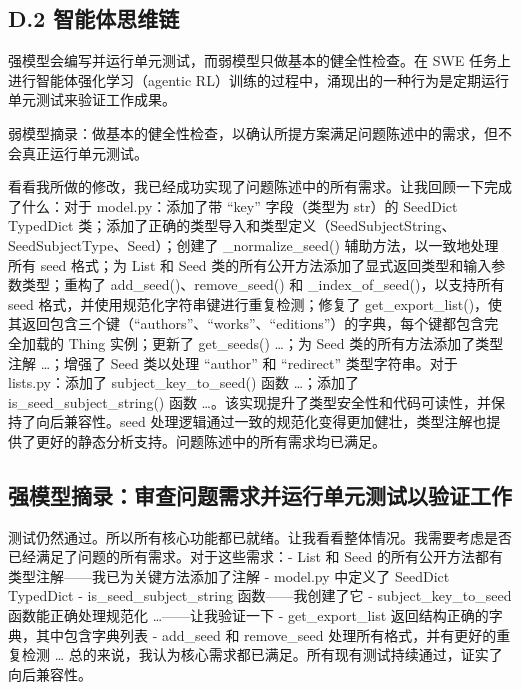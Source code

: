 \subsection{D.2 智能体思维链}\label{d.2-agentic-cots}

强模型会编写并运行单元测试，而弱模型只做基本的健全性检查。在 SWE 任务上进行智能体强化学习（agentic RL）训练的过程中，涌现出的一种行为是定期运行单元测试来验证工作成果。



弱模型摘录：做基本的健全性检查，以确认所提方案满足问题陈述中的需求，但不会真正运行单元测试。

看看我所做的修改，我已经成功实现了问题陈述中的所有需求。让我回顾一下完成了什么：对于 model.py：添加了带 ``key'' 字段（类型为 str）的 SeedDict TypedDict 类；添加了正确的类型导入和类型定义（SeedSubjectString、SeedSubjectType、Seed）；创建了 \_normalize\_seed() 辅助方法，以一致地处理所有 seed 格式；为 List 和 Seed 类的所有公开方法添加了显式返回类型和输入参数类型；重构了 add\_seed()、remove\_seed() 和 \_index\_of\_seed()，以支持所有 seed 格式，并使用规范化字符串键进行重复检测；修复了 get\_export\_list()，使其返回包含三个键（``authors''、``works''、``editions''）的字典，每个键都包含完全加载的 Thing 实例；更新了 get\_seeds() \ldots{}；为 Seed 类的所有方法添加了类型注解 \ldots{}；增强了 Seed 类以处理 ``author'' 和 ``redirect'' 类型字符串。对于 lists.py：添加了 subject\_key\_to\_seed() 函数 \ldots{}；添加了 is\_seed\_subject\_string() 函数 \ldots{}。该实现提升了类型安全性和代码可读性，并保持了向后兼容性。seed 处理逻辑通过一致的规范化变得更加健壮，类型注解也提供了更好的静态分析支持。问题陈述中的所有需求均已满足。

\subsection{强模型摘录：审查问题需求并运行单元测试以验证工作}\label{strong-model-excerpt-reviews-problems-requirements-and-runs-unit-tests-to-check-work.}

测试仍然通过。所以所有核心功能都已就绪。让我看看整体情况。我需要考虑是否已经满足了问题的所有需求。对于这些需求：- List 和 Seed 的所有公开方法都有类型注解——我已为关键方法添加了注解 - model.py 中定义了 SeedDict TypedDict - is\_seed\_subject\_string 函数——我创建了它 - subject\_key\_to\_seed 函数能正确处理规范化 \ldots{}——让我验证一下 - get\_export\_list 返回结构正确的字典，其中包含字典列表 - add\_seed 和 remove\_seed 处理所有格式，并有更好的重复检测 \ldots{} 总的来说，我认为核心需求都已满足。所有现有测试持续通过，证实了向后兼容性。

